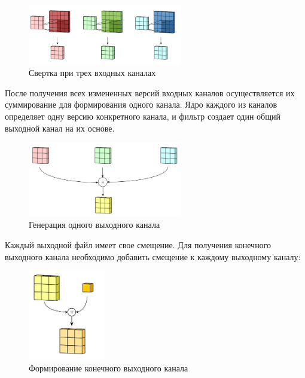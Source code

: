 \documentclass[bachelor, och, coursework]{SCWorks}
\begin{document}
            \begin{figure}[H]
                \centering
                \includegraphics[width=0.6\textwidth]{pic/rgb.png}
                \caption{Свертка при трех входных каналах}
                \label{fig:img5}
            \end{figure}

            После получения всех измененных версий входных каналов осуществляется их суммирование для формирования одного канала. Ядро каждого из каналов определяет одну версию конкретного канала, и фильтр создает один общий выходной канал на их основе.

            \begin{figure}[H]
                \centering
                \includegraphics[width=0.6\textwidth]{pic/tino.png}
                \caption{Генерация одного выходного канала}
                \label{fig:img6}
            \end{figure}

            Каждый выходной файл имеет свое смещение. Для получения конечного выходного канала необходимо добавить смещение к каждому выходному каналу:

            \begin{figure}[H]
                \centering
                \includegraphics[width=0.3\textwidth]{pic/cvc.png}
                \caption{Формирование конечного выходного канала}
                \label{fig:img7}
            \end{figure}
\end{document}
